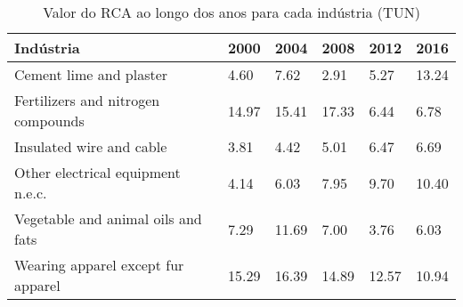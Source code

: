 \begin{table}
\centering
\caption{Valor do RCA ao longo dos anos para cada indústria (TUN)}
\begin{tabular}{p{6cm}p{1.5cm}p{1.5cm}p{1.5cm}p{1.5cm}p{1.5cm}}
\toprule
                         Indústria &  2000 &  2004 &  2008 &  2012 &  2016 \\
\midrule
           Cement lime and plaster &  4.60 &  7.62 &  2.91 &  5.27 & 13.24 \\
Fertilizers and nitrogen compounds & 14.97 & 15.41 & 17.33 &  6.44 &  6.78 \\
          Insulated wire and cable &  3.81 &  4.42 &  5.01 &  6.47 &  6.69 \\
 Other electrical equipment n.e.c. &  4.14 &  6.03 &  7.95 &  9.70 & 10.40 \\
Vegetable and animal oils and fats &  7.29 & 11.69 &  7.00 &  3.76 &  6.03 \\
Wearing apparel except fur apparel & 15.29 & 16.39 & 14.89 & 12.57 & 10.94 \\
\bottomrule
\end{tabular}
\end{table}
